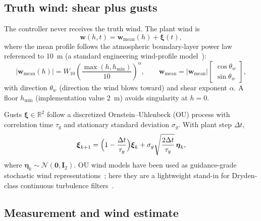 \documentclass[conference]{IEEEtran}
\begin{document}
\subsection{Truth wind: shear plus gusts}

The controller never receives the truth wind.
The plant wind is
\begin{equation}
\mathbf{w}(h,t) = \mathbf{w}_{\mathrm{mean}}(h) + \boldsymbol{\xi}(t),
\label{eq:wsplit}
\end{equation}
where the mean profile follows the atmospheric boundary-layer power law referenced to \SI{10}{\meter} (a standard engineering wind-profile model~\cite{Justus1978}):
\begin{equation}
\bigl|\mathbf{w}_{\mathrm{mean}}(h)\bigr|
=
W_{10}\left(\frac{\max(h,h_{\min})}{10}\right)^{\!\alpha},
\qquad
\mathbf{w}_{\mathrm{mean}}
=
\bigl|\mathbf{w}_{\mathrm{mean}}\bigr|
\begin{bmatrix}
\cos\theta_w \\
\sin\theta_w
\end{bmatrix},
\label{eq:powerlaw}
\end{equation}
with direction $\theta_w$ (direction the wind blows toward) and shear exponent $\alpha$.
A floor $h_{\min}$ (implementation value \SI{2}{\meter}) avoids singularity at $h=0$.

Gusts $\boldsymbol{\xi}\in\mathbb{R}^2$ follow a discretized Ornstein--Uhlenbeck (OU) process with correlation time $\tau_g$ and stationary standard deviation $\sigma_g$.
With plant step $\Delta t$,
\begin{equation}
\boldsymbol{\xi}_{k+1}
=
\Bigl(1-\frac{\Delta t}{\tau_g}\Bigr)\boldsymbol{\xi}_k
+
\sigma_g\sqrt{\frac{2\Delta t}{\tau_g}}\,\boldsymbol{\eta}_k,
\label{eq:ou}
\end{equation}
where $\boldsymbol{\eta}_k\sim\mathcal{N}(\mathbf{0},\mathbf{I}_2)$.
OU wind models have been used as guidance-grade stochastic wind representations~\cite{Turkoglu2014}; here they are a lightweight stand-in for Dryden-class continuous turbulence filters~\cite{Beal1993,MILHDBK1797}.

\subsection{Measurement and wind estimate}
\end{document}

